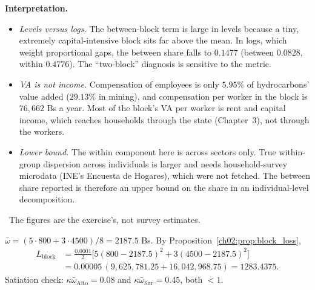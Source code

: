 \documentclass[../solutions_manual.tex]{subfiles}
\begin{document}
\textbf{Interpretation.}
\begin{itemize}
\item \emph{Levels versus logs.} The between-block term is large in levels because a tiny, extremely capital-intensive block sits far above the mean. In logs, which weight proportional gaps, the between share falls to $0.1477$ (between $0.0828$, within $0.4776$). The ``two-block'' diagnosis is sensitive to the metric.
\item \emph{VA is not income.} Compensation of employees is only $5.95\%$ of hydrocarbons' value added ($29.13\%$ in mining), and compensation per worker in the block is $76{,}662$ Bs a year. Most of the block's VA per worker is rent and capital income, which reaches households through the state (Chapter~3), not through the workers.
\item \emph{Lower bound.} The within component here is across sectors only. True within-group dispersion across individuals is larger and needs household-survey microdata (INE's Encuesta de Hogares), which were not fetched. The between share reported is therefore an upper bound on the share in an individual-level decomposition.
\end{itemize}


\illustrative\ The figures are the exercise's, not survey estimates.

 $\bar\omega = (5\cdot800 + 3\cdot4500)/8 = 2187.5$ Bs. By Proposition~\ref{ch02:prop:block_loss},
\[
\begin{aligned}
L_{\text{block}} &= \frac{0.0001}{2}\bigl[5(800 - 2187.5)^2 + 3(4500 - 2187.5)^2\bigr]\\
&= 0.00005\,(9{,}625{,}781.25 + 16{,}042{,}968.75) = 1283.4375 .
\end{aligned}
\]
Satiation check: $\kappa\bar\omega_{\text{Alto}} = 0.08$ and $\kappa\bar\omega_{\text{Sur}} = 0.45$, both $< 1$.
\end{document}
